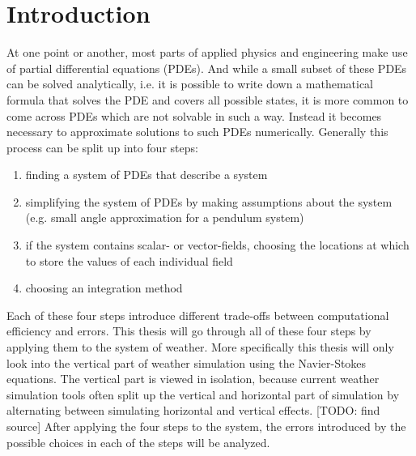 
\chapter{Introduction}\label{chapter:introduction}

At one point or another, most parts of applied physics and engineering make use of partial differential equations (PDEs).
And while a small subset of these PDEs can be solved analytically, i.e. it is possible to write down a mathematical formula that solves the PDE and covers all possible states, it is more common to come across PDEs which are not solvable in such a way.
Instead it becomes necessary to approximate solutions to such PDEs numerically.
Generally this process can be split up into four steps:
\begin{enumerate}
\item finding a system of PDEs that describe a system
\item simplifying the system of PDEs by making assumptions about the system (e.g. small angle approximation for a pendulum system)
\item if the system contains scalar- or vector-fields, choosing the locations at which to store the values of each individual field
\item choosing an integration method
\end{enumerate}
Each of these four steps introduce different trade-offs between computational efficiency and errors.
This thesis will go through all of these four steps by applying them to the system of weather.
More specifically this thesis will only look into the vertical part of weather simulation using the Navier-Stokes equations.
The vertical part is viewed in isolation, because current weather simulation tools often split up the vertical and horizontal part of simulation by alternating between simulating horizontal and vertical effects. [TODO: find source]
After applying the four steps to the system, the errors introduced by the possible choices in each of the steps will be analyzed.